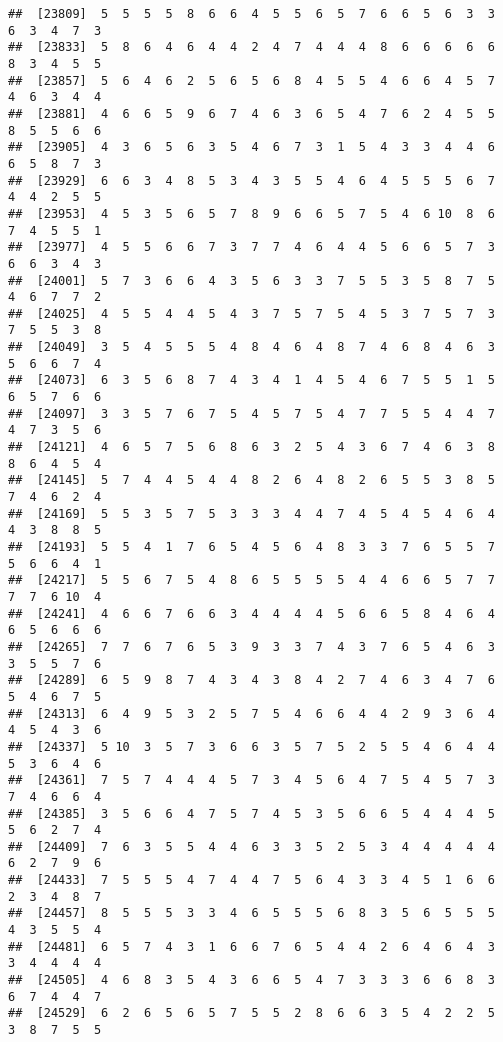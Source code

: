 \documentclass[
]{book}
\begin{document}
\begin{verbatim}
##  [23809]  5  5  5  5  8  6  6  4  5  5  6  5  7  6  6  5  6  3  3  6  3  4  7  3
##  [23833]  5  8  6  4  6  4  4  2  4  7  4  4  4  8  6  6  6  6  6  8  3  4  5  5
##  [23857]  5  6  4  6  2  5  6  5  6  8  4  5  5  4  6  6  4  5  7  4  6  3  4  4
##  [23881]  4  6  6  5  9  6  7  4  6  3  6  5  4  7  6  2  4  5  5  8  5  5  6  6
##  [23905]  4  3  6  5  6  3  5  4  6  7  3  1  5  4  3  3  4  4  6  6  5  8  7  3
##  [23929]  6  6  3  4  8  5  3  4  3  5  5  4  6  4  5  5  5  6  7  4  4  2  5  5
##  [23953]  4  5  3  5  6  5  7  8  9  6  6  5  7  5  4  6 10  8  6  7  4  5  5  1
##  [23977]  4  5  5  6  6  7  3  7  7  4  6  4  4  5  6  6  5  7  3  6  6  3  4  3
##  [24001]  5  7  3  6  6  4  3  5  6  3  3  7  5  5  3  5  8  7  5  4  6  7  7  2
##  [24025]  4  5  5  4  4  5  4  3  7  5  7  5  4  5  3  7  5  7  3  7  5  5  3  8
##  [24049]  3  5  4  5  5  5  4  8  4  6  4  8  7  4  6  8  4  6  3  5  6  6  7  4
##  [24073]  6  3  5  6  8  7  4  3  4  1  4  5  4  6  7  5  5  1  5  6  5  7  6  6
##  [24097]  3  3  5  7  6  7  5  4  5  7  5  4  7  7  5  5  4  4  7  4  7  3  5  6
##  [24121]  4  6  5  7  5  6  8  6  3  2  5  4  3  6  7  4  6  3  8  8  6  4  5  4
##  [24145]  5  7  4  4  5  4  4  8  2  6  4  8  2  6  5  5  3  8  5  7  4  6  2  4
##  [24169]  5  5  3  5  7  5  3  3  3  4  4  7  4  5  4  5  4  6  4  4  3  8  8  5
##  [24193]  5  5  4  1  7  6  5  4  5  6  4  8  3  3  7  6  5  5  7  5  6  6  4  1
##  [24217]  5  5  6  7  5  4  8  6  5  5  5  5  4  4  6  6  5  7  7  7  7  6 10  4
##  [24241]  4  6  6  7  6  6  3  4  4  4  4  5  6  6  5  8  4  6  4  6  5  6  6  6
##  [24265]  7  7  6  7  6  5  3  9  3  3  7  4  3  7  6  5  4  6  3  3  5  5  7  6
##  [24289]  6  5  9  8  7  4  3  4  3  8  4  2  7  4  6  3  4  7  6  5  4  6  7  5
##  [24313]  6  4  9  5  3  2  5  7  5  4  6  6  4  4  2  9  3  6  4  4  5  4  3  6
##  [24337]  5 10  3  5  7  3  6  6  3  5  7  5  2  5  5  4  6  4  4  5  3  6  4  6
##  [24361]  7  5  7  4  4  4  5  7  3  4  5  6  4  7  5  4  5  7  3  7  4  6  6  4
##  [24385]  3  5  6  6  4  7  5  7  4  5  3  5  6  6  5  4  4  4  5  5  6  2  7  4
##  [24409]  7  6  3  5  5  4  4  6  3  3  5  2  5  3  4  4  4  4  4  6  2  7  9  6
##  [24433]  7  5  5  5  4  7  4  4  7  5  6  4  3  3  4  5  1  6  6  2  3  4  8  7
##  [24457]  8  5  5  5  3  3  4  6  5  5  5  6  8  3  5  6  5  5  5  4  3  5  5  4
##  [24481]  6  5  7  4  3  1  6  6  7  6  5  4  4  2  6  4  6  4  3  3  4  4  4  4
##  [24505]  4  6  8  3  5  4  3  6  6  5  4  7  3  3  3  6  6  8  3  6  7  4  4  7
##  [24529]  6  2  6  5  6  5  7  5  5  2  8  6  6  3  5  4  2  2  5  3  8  7  5  5

\end{verbatim}
\end{document}
